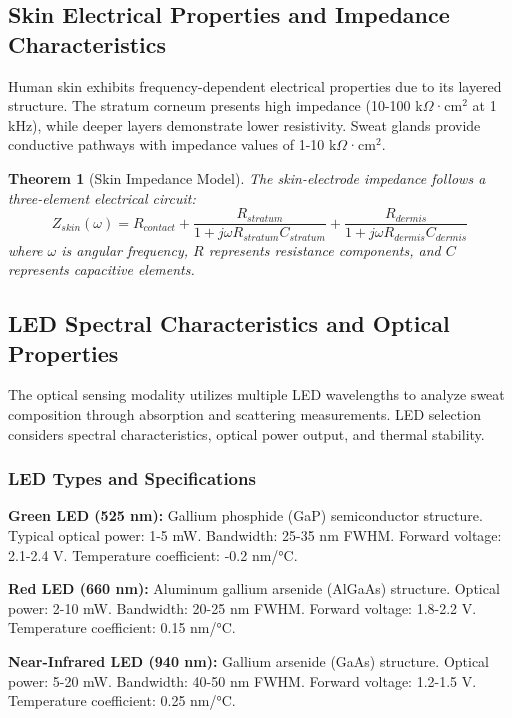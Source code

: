 \documentclass[12pt,a4paper]{article}
\newtheorem{theorem}{Theorem}[section]
\begin{document}
\subsection{Skin Electrical Properties and Impedance Characteristics}

Human skin exhibits frequency-dependent electrical properties due to its layered structure. The stratum corneum presents high impedance (10-100 k\(\Omega\)·cm\(^2\) at 1 kHz), while deeper layers demonstrate lower resistivity. Sweat glands provide conductive pathways with impedance values of 1-10 k\(\Omega\)·cm\(^2\).

\begin{theorem}[Skin Impedance Model]
The skin-electrode impedance follows a three-element electrical circuit:
\begin{equation}
Z_{skin}(\omega) = R_{contact} + \frac{R_{stratum}}{1 + j\omega R_{stratum}C_{stratum}} + \frac{R_{dermis}}{1 + j\omega R_{dermis}C_{dermis}}
\end{equation}
where \(\omega\) is angular frequency, \(R\) represents resistance components, and \(C\) represents capacitive elements.
\end{theorem}

\subsection{LED Spectral Characteristics and Optical Properties}

The optical sensing modality utilizes multiple LED wavelengths to analyze sweat composition through absorption and scattering measurements. LED selection considers spectral characteristics, optical power output, and thermal stability.

\subsubsection{LED Types and Specifications}

\textbf{Green LED (525 nm):} Gallium phosphide (GaP) semiconductor structure. Typical optical power: 1-5 mW. Bandwidth: 25-35 nm FWHM. Forward voltage: 2.1-2.4 V. Temperature coefficient: -0.2 nm/°C.

\textbf{Red LED (660 nm):} Aluminum gallium arsenide (AlGaAs) structure. Optical power: 2-10 mW. Bandwidth: 20-25 nm FWHM. Forward voltage: 1.8-2.2 V. Temperature coefficient: 0.15 nm/°C.

\textbf{Near-Infrared LED (940 nm):} Gallium arsenide (GaAs) structure. Optical power: 5-20 mW. Bandwidth: 40-50 nm FWHM. Forward voltage: 1.2-1.5 V. Temperature coefficient: 0.25 nm/°C.
\end{document}
